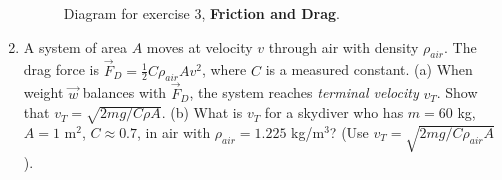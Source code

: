 \documentclass[10pt]{article}
\begin{document}
\begin{enumerate}
\begin{figure}[hb]
\caption{\label{fig:blocks} Diagram for exercise 3, \textbf{Friction and Drag}.}
\end{figure}
\item A system of area $A$ moves at velocity $v$ through air with density $\rho_{air}$.  The drag force is $\vec{F}_D = \frac{1}{2}C\rho_{air} A v^2$, where $C$ is a measured constant.  (a) When weight $\vec{w}$ balances with $\vec{F}_D$, the system reaches \textit{terminal velocity} $v_{T}$.  Show that $v_T = \sqrt{2mg/C\rho A}$.  (b) What is $v_{T}$ for a skydiver who has $m=60$ kg, $A=1$ m$^2$, $C \approx 0.7$, in air with $\rho_{air}=1.225$ kg/m$^3$? (Use $v_T = \sqrt{2mg/C\rho_{air} A}$).
\end{enumerate}
\end{document}
